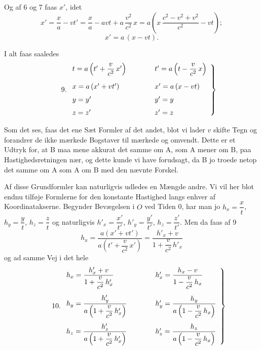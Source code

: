 \documentclass[12pt,a4paper]{article}
\newcommand{\opage}[1]{\marginnote{\footnotesize\textit{[#1]}}}
\begin{document}
Og af 6 og 7 faas $x'$, idet
\[
  x' = \frac{x}{a} - vt'
     = \frac{x}{a} - avt + a\,\frac{v^{2}}{c^{2}}\,x
     = a\left(x\,\frac{c^{2}-v^{2}+v^{2}}{c^{2}} - vt\right);
\]
\begin{equation}\tag*{8.}
  x' = a\,(x - vt).
\end{equation}

I alt faas saaledes
\begin{equation}\tag*{9.}
  \left.
  \begin{array}{l@{\qquad\qquad}l}
    t = a\left(t' + \dfrac{v}{c^{2}}\,x'\right)
      & t' = a\left(t - \dfrac{v}{c^{2}}\,x\right)\\[3ex]
    x = a\,(x' + vt') & x' = a\,(x - vt)\\[1.5ex]
    y = y' & y' = y\\[1.5ex]
    z = z' & z' = z
  \end{array}
  \right\}
\end{equation}

Som det ses, faas det ene Sæt Formler af det andet, blot vi lader $v$
skifte Tegn og forandrer de ikke mærkede Bogstaver til mærkede og omvendt.
Dette er et Udtryk for, at B maa mene akkurat det
\opage{13} samme om A, som A mener om B, paa Hastighedsretningen nær, og dette kunde
vi have forudsagt, da B jo troede netop det samme om A som A om B med den
nævnte Forskel.

Af disse Grundformler kan naturligvis udledes en Mængde andre. Vi vil her
blot endnu tilføje Formlerne for den konstante Hastighed langs enhver af
Koordinatakserne. Begynder Bevægelsen i $O$ ved Tiden 0, har man jo
$h_{x} = \dfrac{x}{t}$, $h_{y} = \dfrac{y}{t}$, $h_{z} = \dfrac{z}{t}$ og
naturligvis $h'_{x} = \dfrac{x'}{t'}$, $h'_{y} = \dfrac{y'}{t'}$,
$h_{z} = \dfrac{z'}{t'}$. Men da faas af 9
\[
  h_{x} = \frac{a(x' + vt')}{a\left(t' + \dfrac{v}{c^{2}}\,x'\right)}
        = \frac{h'_{x} + v}{1 + \dfrac{v}{c^{2}}\,h'_{x}}
\]
og ad samme Vej i det hele
\begin{equation}\tag*{10.}
  \left.
  \begin{array}{l@{\qquad\qquad}l}
    h_{x} = \dfrac{h'_{x} + v}{1 + \dfrac{v}{c^{2}}\,h'_{x}}
      & h'_{x} = \dfrac{h_{x} - v}{1 - \dfrac{v}{c^{2}}\,h_{x}}\\[5ex]
    h_{y} = \dfrac{h'_{y}}{a\left(1 + \dfrac{v}{c^{2}}\,h'_{x}\right)}
      & h'_{y} = \dfrac{h_{y}}{a\left(1 - \dfrac{v}{c^{2}}\,h_{x}\right)}\\[5ex]
    h_{z} = \dfrac{h'_{z}}{a\left(1 + \dfrac{v}{c^{2}}\,h'_{x}\right)}
      & h'_{z} = \dfrac{h_{z}}{a\left(1 - \dfrac{v}{c^{2}}\,h_{x}\right)}
  \end{array}
  \right\}
\end{equation}
\end{document}
